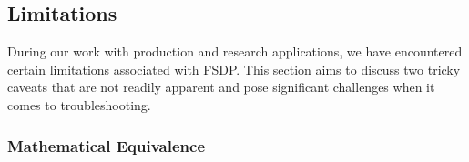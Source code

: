 



\subsection{Limitations}

During our work with production and research applications, we have encountered certain limitations associated with FSDP. This section aims to discuss two tricky caveats that are not readily apparent and pose significant challenges when it comes to troubleshooting. 

\subsubsection{Mathematical Equivalence} \hfill \break


